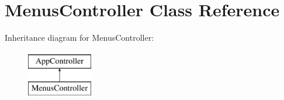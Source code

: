 \hypertarget{class_menus_controller}{
\section{\-Menus\-Controller \-Class \-Reference}
\label{class_menus_controller}
}
\-Inheritance diagram for \-Menus\-Controller\-:\begin{figure}[H]
\begin{center}
\leavevmode
\includegraphics[height=2.000000cm]{class_menus_controller}
\end{center}
\end{figure}
